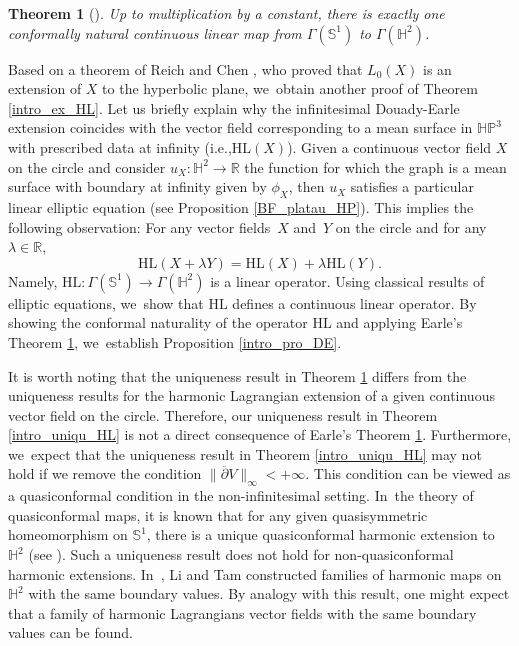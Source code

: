\documentclass[11pt]{article}
\newcommand{\ie}{i.e.,\xspace}
\theoremstyle{plain}
\newtheorem{theorem}[cor]{Theorem}
\theoremstyle{definition}
\newcommand{\HP}{\mathbb{HP}^3}
\begin{document}
\begin{theorem}[\cite{Uniqueness_of_operator_L}]\label{intro_earle_unique}
Up to multiplication by a constant, there is exactly one conformally natural continuous linear map from \(\Gamma(\mathbb{S}^1)\) to \(\Gamma(\mathbb{H}^2)\).
\end{theorem}

Based on a theorem of Reich and Chen \cite{Extension_with_bounded_derivative}, who proved that \(L_0(X) \) is an extension of \(X \) to the hyperbolic plane, we~obtain another proof of Theorem \ref{intro_ex_HL}. Let us briefly explain why the infinitesimal Douady-Earle extension coincides with the vector field corresponding to a mean surface in \(\HP\) with prescribed data at infinity (\ie $\mathrm{HL}(X)$). Given a continuous vector field \(X \) on the circle and consider \(u_X: \mathbb{H}^2 \to \mathbb{R} \) the function for which the graph is a mean surface with boundary at infinity given by \(\phi_X\), then \(u_X \) satisfies a particular linear elliptic equation (see Proposition \ref{BF_platau_HP}). This implies the following observation: For any vector fields~\(X \) and~\(Y \) on the circle and for any \(\lambda \in \mathbb{R}\),
\[
\mathrm{HL}(X + \lambda Y) = \mathrm{HL}(X) + \lambda \mathrm{HL}(Y).
\]
Namely, \(\mathrm{HL}: \Gamma(\mathbb{S}^1) \to \Gamma(\mathbb{H}^2)\) is
a linear operator. Using classical results of elliptic equations, we~show
that \(\mathrm{HL}\) defines a continuous linear operator. By showing the
conformal naturality of the operator \(\mathrm{HL}\) and applying Earle's
Theorem \ref{intro_earle_unique}, we~establish Proposition
\ref{intro_pro_DE}.

It is worth noting that the uniqueness result in Theorem \ref{intro_earle_unique} differs from the uniqueness results for the harmonic Lagrangian extension of a given continuous vector field on the circle. Therefore, our uniqueness result in Theorem \ref{intro_uniqu_HL} is not a direct consequence of Earle's Theorem \ref{intro_earle_unique}. Furthermore, we~expect that the uniqueness result in Theorem \ref{intro_uniqu_HL} may not hold if we remove the condition \(\lVert \overline{\partial} V \rVert_{\infty} < +\infty\). This condition can be viewed as a quasiconformal condition in the non-infinitesimal setting. In~the theory of quasiconformal maps, it is known that for any given quasisymmetric homeomorphism on \(\mathbb{S}^1\), there is a unique quasiconformal harmonic extension to \(\mathbb{H}^2\) (see \cite{LI_Tam1, Schoen_conjecture}). Such a uniqueness result does not hold for non-quasiconformal harmonic extensions. In~\cite{LI_Tam1, Li_Tam2}, Li and Tam constructed families of harmonic maps on \(\mathbb{H}^2\) with the same boundary values. By analogy with this result, one might expect that a family of harmonic Lagrangians vector fields with the same boundary values can be found.
\end{document}

